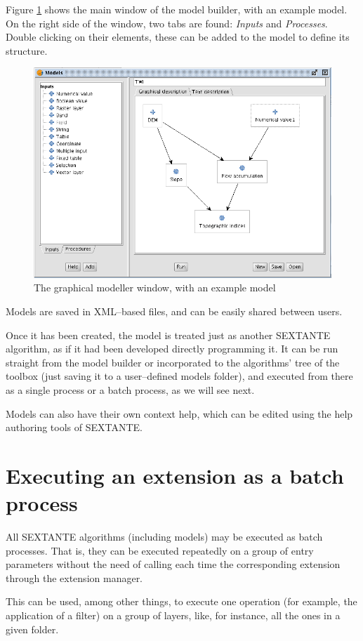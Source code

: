 \documentclass[12pt,a4paper,twocolumn]{article}
\begin{document}
Figure \ref{Fig:Model} shows the main window of the model builder, with an example model. On the right side of the window, two tabs are found: \emph{Inputs} and \emph{Processes}. Double clicking on their elements, these can be added to the model to define its structure.

\begin{figure}[!hbt]
 \centering
 \includegraphics[width=.7\textwidth]{Model.png}
\caption{The graphical modeller window, with an example model}
\label{Fig:Model}
\end{figure}

Models are saved in XML--based files, and can be easily shared between users.

Once it has been created, the model is treated just as another SEXTANTE algorithm, as if it had been developed directly programming it. It can be run straight from the model builder or incorporated to the algorithms' tree of the toolbox (just saving it to a user--defined models folder), and executed from there as a single process or a batch process, as we will see next.

Models can also have their own context help, which can be edited using the help authoring tools of SEXTANTE.

\section{Executing an extension as a batch process}

All SEXTANTE algorithms (including models) may be executed as batch processes. That is, they can be executed repeatedly on a group of entry parameters without the need of calling each time the corresponding extension through the extension manager.

This can be used, among other things, to execute one operation (for example, the application of a filter) on a group of layers, like, for instance, all the ones in a given folder.
\end{document}
